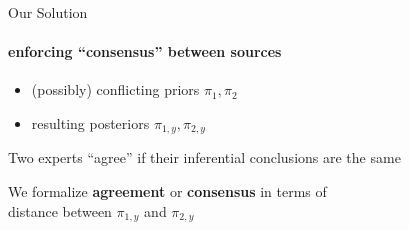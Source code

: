 \documentclass[9 pt]{beamer}
\begin{document}
\begin{frame}{Our Solution}
\framesubtitle{enforcing ``consensus'' between sources}

\begin{itemize}
    \item (possibly) conflicting priors $\pi_1 , \pi_2$
    \item resulting posteriors $\pi_{1,y}, \pi_{2,y}$
\end{itemize}

\vspace{0.5cm}
Two experts ``agree'' if their inferential conclusions are the same
\vspace{0.5cm}

\pause 
\pause

\begin{exampleblock}

\begin{center}
    
We formalize \textbf{\color{light} agreement} or \textbf{\color{light}consensus} in terms of\\ distance between $\pi_{1,y}$ and $\pi_{2,y}$
\end{center}
\end{exampleblock}




\end{frame}
\end{document}
